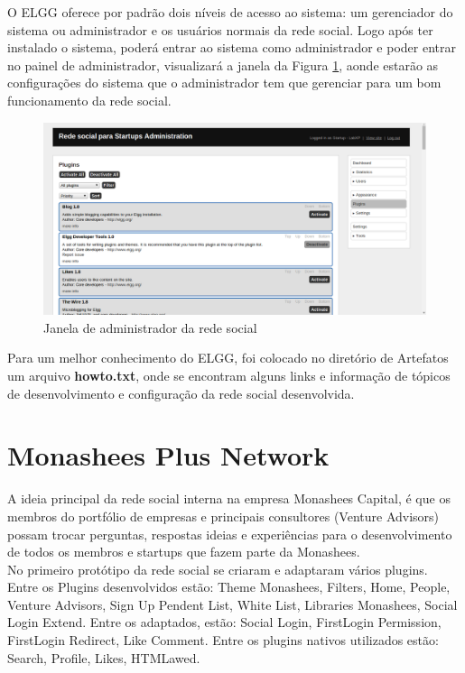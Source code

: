 \documentclass[12pt, letterpaper, onecolumn]{article}
\begin{document}
O ELGG oferece por padrão dois níveis de acesso ao sistema: um gerenciador do sistema ou administrador e os usuários normais da rede social. Logo após ter instalado o sistema, poderá entrar ao sistema como administrador e poder entrar no painel de administrador, visualizará a janela da Figura \ref{fig:admin}, aonde estarão as configurações do sistema que o administrador tem que gerenciar para um bom funcionamento da rede social. 

\begin{figure}[htpb]
\centering
\includegraphics[scale=.35]{images/admin.png}
\caption{Janela de administrador da rede social}
\label{fig:admin}
\end{figure}


Para um melhor conhecimento do ELGG, foi colocado no diretório de Artefatos um arquivo {\bf howto.txt}, onde se encontram alguns links e informação de tópicos de desenvolvimento e configuração da rede social desenvolvida.

\section{Monashees Plus Network}
A ideia principal da rede social interna na empresa Monashees Capital, é que os membros do portfólio de empresas e principais consultores (Venture Advisors) possam trocar perguntas, respostas ideias e experiências para o desenvolvimento de todos os membros e startups que fazem parte da Monashees. \\

No primeiro protótipo da rede social se criaram e adaptaram vários plugins. Entre os Plugins desenvolvidos estão: Theme Monashees, Filters, Home, People, Venture Advisors, Sign Up Pendent List, White List, Libraries Monashees, Social Login Extend. Entre os adaptados, estão: Social Login, FirstLogin Permission, FirstLogin Redirect, Like Comment. Entre os plugins nativos utilizados estão: Search, Profile, Likes, HTMLawed.
\end{document}
